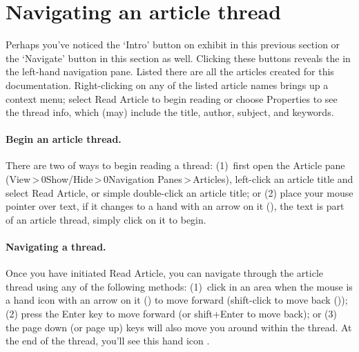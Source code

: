 \documentclass{article}
\def\bART{\placeImage{Art-Start}{10bp}{10bp}}
\def\cART{\placeImage{Art-Down}{10bp}{10bp}}
\def\rART{\placeImage{Art-Up}{10bp}{10bp}}
\def\eART{\placeImage{Art-End}{10bp}{10bp}}
\begin{document}
\section{Navigating an article thread}

%


\begin{multicols}{2}
\noindent{}%
%
\noindent Perhaps you've noticed the `Intro' button on exhibit in this
previous section or the `Navigate' button in this section as well. Clicking
these buttons reveals the  in the left-hand navigation
pane. Listed there are all the articles created for this documentation.
Right-clicking on any of the listed article names brings up a context menu;
select \textsf{Read Article} to begin reading or choose \textsf{Properties}
to see the thread info, which (may) include the title, author, subject, and
keywords.

\paragraph*{Begin an article thread.} There are two of ways to begin
reading a thread: (1)~first open the \textsf{Article} pane
(\textsf{View\,>\,\penalty0Show/Hide\,>\,\penalty0Navigation
Panes\,>\,Articles}), left-click an article title and select \textsf{Read
Article}, or simple double-click an article title; or (2) place your mouse
pointer over text, if it changes to a hand with an arrow on it (\bART), the text is
part of an article thread, simply click on it to begin.

\paragraph*{Navigating a thread.} Once you have initiated \textsf{Read
Article}, you can navigate through the article thread using any of the
following methods: (1)~click in
an area when the mouse is a hand icon with an arrow on it (\cART) to move forward
(shift-click to move back (\rART)); (2) press the \textsf{Enter} key to move forward
(or shift+\textsf{Enter} to move back); or (3) the page down (or page up)
keys will also move you around within the thread. At the end of the thread, you'll
see this hand icon \eART.


\end{multicols}
\end{document}
